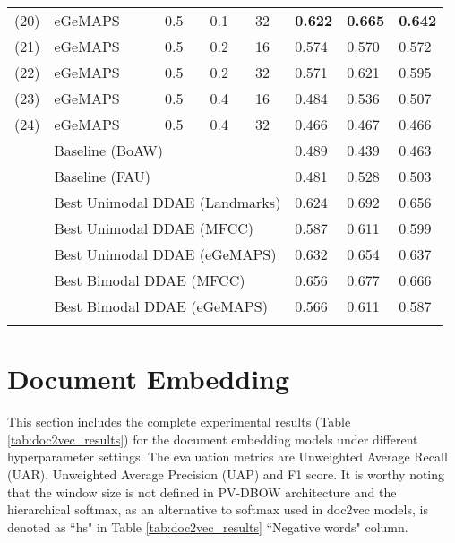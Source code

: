 \begin{table}[htb]
\begin{tabular}{l|p{1.8cm}|p{1.25cm}|l|p{1.2cm}|l|l|l}
        (20) & eGeMAPS & 0.5 & 0.1 & 32 & \textbf{0.622} & \textbf{0.665} & \textbf{0.642} \\
        (21) & eGeMAPS & 0.5 & 0.2 & 16 & 0.574 & 0.570 & 0.572 \\
        (22) & eGeMAPS & 0.5 & 0.2 & 32 & 0.571 & 0.621 & 0.595 \\
        (23) & eGeMAPS & 0.5 & 0.4 & 16 & 0.484 & 0.536 & 0.507 \\
        (24) & eGeMAPS & 0.5 & 0.4 & 32 & 0.466 & 0.467 & 0.466 \\
        \hline
        & \multicolumn{4}{l|}{Baseline (BoAW)} & 0.489 & 0.439 & 0.463 \\
        & \multicolumn{4}{l|}{Baseline (FAU)} & 0.481 & 0.528 & 0.503 \\
        \hline
        & \multicolumn{4}{l|}{Best Unimodal DDAE (Landmarks)} & 0.624 & 0.692 & 0.656 \\
        & \multicolumn{4}{l|}{Best Unimodal DDAE (MFCC)} & 0.587 & 0.611 & 0.599 \\
        & \multicolumn{4}{l|}{Best Unimodal DDAE (eGeMAPS)} & 0.632 & 0.654 & 0.637 \\
        \hline
        & \multicolumn{4}{l|}{Best Bimodal DDAE (MFCC)} & 0.656 & 0.677 & 0.666 \\
        & \multicolumn{4}{l|}{Best Bimodal DDAE (eGeMAPS)} & 0.566 & 0.611 & 0.587 \\
    \Xhline{2\arrayrulewidth}
    \end{tabular}
    \label{tab:multimodal_res_full}
\end{table}


\section{Document Embedding}

This section includes the complete experimental results (Table \ref{tab:doc2vec_results}) for the document embedding models under different hyperparameter settings. The evaluation metrics are Unweighted Average Recall (UAR), Unweighted Average Precision (UAP) and F1 score. It is worthy noting that the window size is not defined in PV-DBOW architecture and the hierarchical softmax, as an alternative to softmax used in doc2vec models, is denoted as ``hs" in Table \ref{tab:doc2vec_results} ``Negative words" column. 

